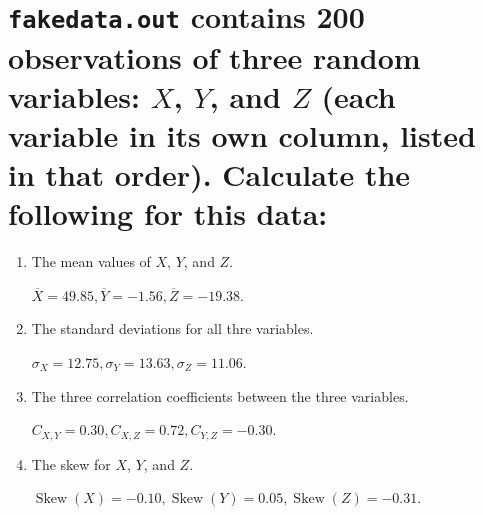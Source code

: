 
    \section{\texttt{fakedata.out} contains 200 observations
    of three random variables: \texorpdfstring{$X$}{X},
    \texorpdfstring{$Y$}{Y}, and \texorpdfstring{$Z$}{Z}
    (each variable in its own column, listed in that order).
    Calculate the following for this data:}

    \begin{enumerate}[label=\textbf{\Alph*}.]
        \item The mean values of $X$, $Y$, and $Z$.

        $\overline{X} = 49.85, \overline{Y} = -1.56, \overline{Z} = -19.38$.

        \item The standard deviations for all thre variables.

        $\sigma_{X} = 12.75, \sigma_{Y} = 13.63, \sigma_{Z} = 11.06$.

        \item The three correlation coefficients between the three variables.

        $C_{X,Y} = 0.30, C_{X,Z} = 0.72, C_{Y,Z} = -0.30$.

        \item The skew for $X$, $Y$, and $Z$.
        
        $\operatorname{Skew}(X) = -0.10, \operatorname{Skew}(Y) = 0.05, \operatorname{Skew}(Z) = -0.31$.
    \end{enumerate}
    